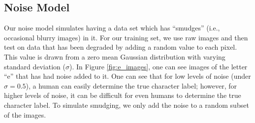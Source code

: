 \documentclass[10pt,twocolumn,letterpaper]{article}
\begin{document}
\subsection{Noise Model}
Our noise model simulates having a data set which has ``smudges'' (i.e.,
occasional blurry images) in it. For our training set, we use raw images and
then test on data that has been degraded by adding a random value to each
pixel. This value is drawn from a zero mean Gaussian distribution with
varying standard deviation ($\sigma$).  In Figure \ref{fig:e_images}, one can see
images of the letter ``e'' that has had noise added to it. One can see
that for low levels of noise (under $\sigma = 0.5$), a human can easily
determine the true character label; however, for higher levels of noise,
it can be difficult for even humans to determine the true character label.
To simulate smudging, we only add the noise to a random subset of the images.
\end{document}
